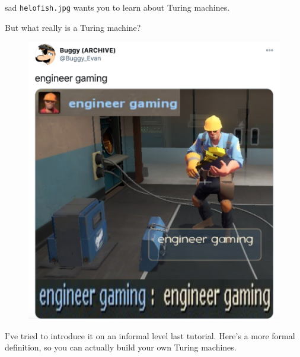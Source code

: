 \documentclass{beamer}
\begin{document}
\begin{frame}{sad \texttt{helo{\textunderscore}fish.jpg} wants you to learn about Turing machines.}

But what really is a Turing machine? 

\begin{figure}[h]
\includegraphics[scale=0.3]{img/engineer_gaming.png}
\end{figure}


I've tried to introduce it on an informal level last tutorial. Here's a more formal definition, so you can actually build your own Turing machines.

\end{frame}
\end{document}
